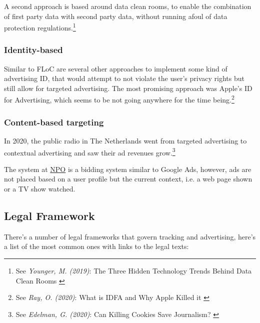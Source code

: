 A second approach is based around data clean rooms, to enable the combination of first party data with second party data, without running afoul of data protection regulations.\footnote{See \textit{Younger, M. (2019)}: The Three Hidden Technology Trends Behind Data Clean Rooms \cite{cleanRoom}}

\subsubsection{Identity-based}

Similar to FLoC are several other approaches to implement some kind of advertising ID, that would attempt to not violate the user's privacy rights but still allow for targeted advertising. The most promising approach was Apple's ID for Advertising, which seems to be not going anywhere for the time being.\footnote{See \textit{Ray, O. (2020)}: What is IDFA and Why Apple Killed it \cite{cleanRoom}}

\subsubsection{Content-based targeting}

In 2020, the public radio in The Netherlands went from targeted advertising to contextual advertising and saw their ad revenues grow.\footnote{See \textit{Edelman, G. (2020)}: Can Killing Cookies Save Journalism? \cite{killingCookies}} 

The system at \href{https://over.npo.nl/}{NPO} is a bidding system similar to Google Ads, however, ads are not placed based on a user profile but the current context, i.e. a web page shown or a TV show watched.

\subsection{Legal Framework}

There's a number of legal frameworks that govern tracking and advertising, here's a list of the most common ones with links to the legal texts:

